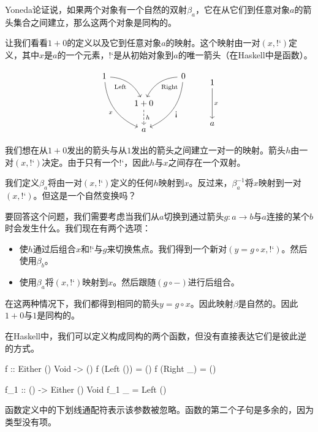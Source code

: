 \documentclass[DaoFP]{subfiles}
\begin{document}
 Yoneda论证说，如果两个对象有一个自然的双射$\beta_a$，它在从它们到任意对象$a$的箭头集合之间建立，那么这两个对象是同构的。

 让我们看看$1 + 0$的定义以及它到任意对象$a$的映射。这个映射由一对$(x, \mbox{!`})$定义，其中$x$是$a$的一个元素，$\mbox{!`}$是从初始对象到$a$的唯一箭头（在Haskell中是函数）。

 \[
  \begin{tikzcd}
   1
   \arrow[dr,  bend left, "\text{Left}"']
   \arrow[ddr, bend right, "x"']
   && 0
   \arrow[dl, bend right, "\text{Right}"]
   \arrow[ddl, bend left, "\mbox{!`}"]
   \\
   &1 + 0
   \arrow[d, dashed, "h"]
   \\
   & a
  \end{tikzcd}
  \qquad
  \begin{tikzcd}
   1
   \arrow[dd, "x"]
   \\
   \\
   a
  \end{tikzcd}
 \]

 我们想在从$1+0$发出的箭头与从$1$发出的箭头之间建立一对一的映射。箭头$h$由一对$(x, \mbox{!`})$决定。由于只有一个$\mbox{!`}$，因此$h$与$x$之间存在一个双射。

 我们定义$\beta_a$将由一对$(x, \mbox{!`})$定义的任何$h$映射到$x$。反过来，$\beta^{-1}_a$将$x$映射到一对$(x, \mbox{!`})$。但这是一个自然变换吗？

 要回答这个问题，我们需要考虑当我们从$a$切换到通过箭头$g \colon a \to b$与$a$连接的某个$b$时会发生什么。我们现在有两个选项：
 \begin{itemize}
  \item 使$h$通过后组合$x$和$\mbox{!`}$与$g$来切换焦点。我们得到一个新对$(y = g \circ x, \mbox{!`})$。然后使用$\beta_b$。
  \item 使用$\beta_a$将$(x, \mbox{!`})$映射到$x$。然后跟随$(g \circ -)$进行后组合。
 \end{itemize}
 在这两种情况下，我们都得到相同的箭头$y = g \circ x$。因此映射$\beta$是自然的。因此$1 + 0$与$1$是同构的。

 在Haskell中，我们可以定义构成同构的两个函数，但没有直接表达它们是彼此逆的方式。
 \begin{haskell}
  f :: Either () Void -> ()
  f (Left ()) = ()
  f (Right _) = ()

  f_1 :: () -> Either () Void
  f_1 _ = Left ()
 \end{haskell}
 函数定义中的下划线通配符表示该参数被忽略。函数的第二个子句是多余的，因为类型没有项。
\end{document}
